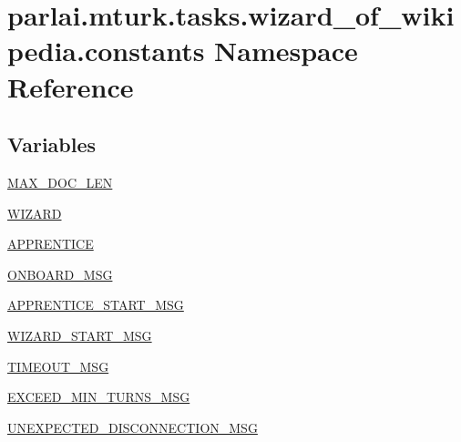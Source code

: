 \hypertarget{namespaceparlai_1_1mturk_1_1tasks_1_1wizard__of__wikipedia_1_1constants}{}\section{parlai.\+mturk.\+tasks.\+wizard\+\_\+of\+\_\+wikipedia.\+constants Namespace Reference}
\label{namespaceparlai_1_1mturk_1_1tasks_1_1wizard__of__wikipedia_1_1constants}
\subsection*{Variables}
\begin{DoxyCompactItemize}
\item 
\hyperlink{namespaceparlai_1_1mturk_1_1tasks_1_1wizard__of__wikipedia_1_1constants_aa3ef6ca8333d63167d9ea942344c3a98}{M\+A\+X\+\_\+\+D\+O\+C\+\_\+\+L\+EN}
\item 
\hyperlink{namespaceparlai_1_1mturk_1_1tasks_1_1wizard__of__wikipedia_1_1constants_a29eb819d107d0a513a64e67f1989a177}{W\+I\+Z\+A\+RD}
\item 
\hyperlink{namespaceparlai_1_1mturk_1_1tasks_1_1wizard__of__wikipedia_1_1constants_acfb3953bff3ac5b2834f12bd9791e8ba}{A\+P\+P\+R\+E\+N\+T\+I\+CE}
\item 
\hyperlink{namespaceparlai_1_1mturk_1_1tasks_1_1wizard__of__wikipedia_1_1constants_adb07b8811264e219ee1a48d482d5e18c}{O\+N\+B\+O\+A\+R\+D\+\_\+\+M\+SG}
\item 
\hyperlink{namespaceparlai_1_1mturk_1_1tasks_1_1wizard__of__wikipedia_1_1constants_a834fe4eef1232167db20c2366e370cce}{A\+P\+P\+R\+E\+N\+T\+I\+C\+E\+\_\+\+S\+T\+A\+R\+T\+\_\+\+M\+SG}
\item 
\hyperlink{namespaceparlai_1_1mturk_1_1tasks_1_1wizard__of__wikipedia_1_1constants_a04aee0702f7724936fdd73c183fb961f}{W\+I\+Z\+A\+R\+D\+\_\+\+S\+T\+A\+R\+T\+\_\+\+M\+SG}
\item 
\hyperlink{namespaceparlai_1_1mturk_1_1tasks_1_1wizard__of__wikipedia_1_1constants_abf922f8a518e3585773f590d3a90a80d}{T\+I\+M\+E\+O\+U\+T\+\_\+\+M\+SG}
\item 
\hyperlink{namespaceparlai_1_1mturk_1_1tasks_1_1wizard__of__wikipedia_1_1constants_ad03c4bc9508fd179dd3092d81d3ee88e}{E\+X\+C\+E\+E\+D\+\_\+\+M\+I\+N\+\_\+\+T\+U\+R\+N\+S\+\_\+\+M\+SG}
\item 
\hyperlink{namespaceparlai_1_1mturk_1_1tasks_1_1wizard__of__wikipedia_1_1constants_ab90f40234660f089747404e8b76fc5d7}{U\+N\+E\+X\+P\+E\+C\+T\+E\+D\+\_\+\+D\+I\+S\+C\+O\+N\+N\+E\+C\+T\+I\+O\+N\+\_\+\+M\+SG}

\end{DoxyCompactItemize}
